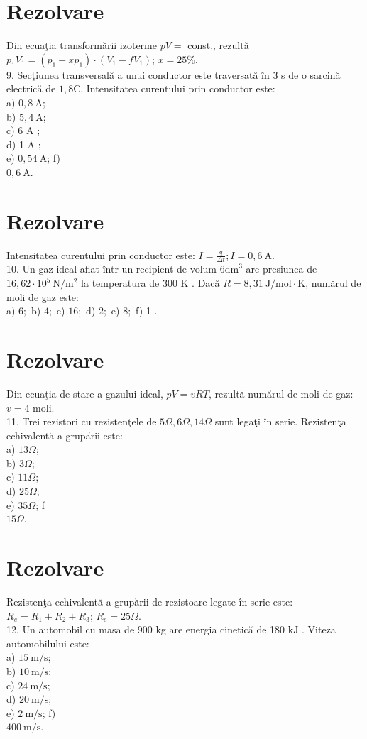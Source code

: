 \section*{Rezolvare}
Din ecuaţia transformării izoterme $p V=$ const., rezultă $p_{1} V_{1}=\left(p_{1}+x p_{1}\right) \cdot\left(V_{1}-f V_{1}\right)$; $x=25 \%$.\\
9. Secţiunea transversală a unui conductor este traversată în 3 s de o sarcină electrică de $1,8 \mathrm{C}$. Intensitatea curentului prin conductor este:\\
a) $0,8 \mathrm{~A}$;\\
b) $5,4 \mathrm{~A}$;\\
c) 6 A ;\\
d) 1 A ;\\
e) $0,54 \mathrm{~A}$; f)\\
$0,6 \mathrm{~A}$.

\section*{Rezolvare}
Intensitatea curentului prin conductor este: $I=\frac{q}{\Delta t} ; I=0,6 \mathrm{~A}$.\\
10. Un gaz ideal aflat într-un recipient de volum $6 \mathrm{dm}^{3}$ are presiunea de $16,62 \cdot 10^{5} \mathrm{~N} / \mathrm{m}^{2}$ la temperatura de 300 K . Dacă $R=8,31 \mathrm{~J} / \mathrm{mol} \cdot \mathrm{K}$, numărul de moli de gaz este:\\
a) $6 ;$ b) $4 ;$ c) $16 ;$ d) $2 ;$ e) $8 ;$ f) 1 .

\section*{Rezolvare}
Din ecuaţia de stare a gazului ideal, $p V=v R T$, rezultă numărul de moli de gaz: $v=4$ moli.\\
11. Trei rezistori cu rezistenţele de $5 \Omega, 6 \Omega, 14 \Omega$ sunt legaţi în serie. Rezistenţa echivalentă a grupării este:\\
a) $13 \Omega$;\\
b) $3 \Omega$;\\
c) $11 \Omega$;\\
d) $25 \Omega$;\\
e) $35 \Omega$; f\\
$15 \Omega$.

\section*{Rezolvare}
Rezistenţa echivalentă a grupării de rezistoare legate în serie este: $R_{e}=R_{1}+R_{2}+R_{3}$; $R_{e}=25 \Omega$.\\
12. Un automobil cu masa de 900 kg are energia cinetică de 180 kJ . Viteza automobilului este:\\
a) $15 \mathrm{~m} / \mathrm{s}$;\\
b) $10 \mathrm{~m} / \mathrm{s}$;\\
c) $24 \mathrm{~m} / \mathrm{s}$;\\
d) $20 \mathrm{~m} / \mathrm{s}$;\\
e) $2 \mathrm{~m} / \mathrm{s}$; f)\\
$400 \mathrm{~m} / \mathrm{s}$.

